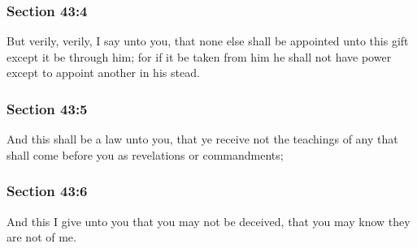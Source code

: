 	\subsubsection{Section 43:4} %
		\label{DC43-4}

		But verily, verily, I say unto you, that none else shall be appointed unto this gift except it be through him; for if it be taken from him he shall not have power except to appoint another in his stead.


	\subsubsection{Section 43:5} %
		\label{DC43-5}

		And this shall be a law unto you, that ye receive not the teachings of any that shall come before you as revelations or commandments;


	\subsubsection{Section 43:6} %
		\label{DC43-6}

		And this I give unto you that you may not be deceived, that you may know they are not of me.



